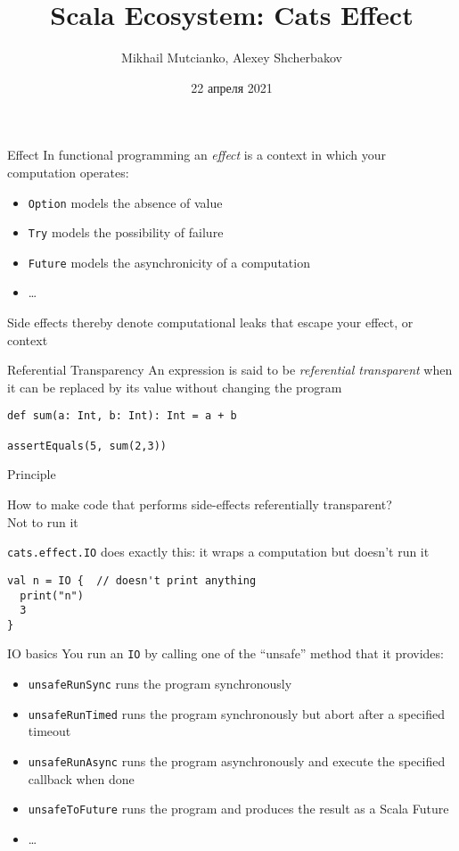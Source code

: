 \documentclass[aspectratio=169]{beamer}
\title{Scala Ecosystem: Cats Effect}
\author{Mikhail Mutcianko, Alexey Shcherbakov}
\institute{СПБгУ, СП}
\date{22 апреля 2021}
\begin{document}
\frame{\titlepage}

\begin{frame}{Effect}
  In functional programming an \textit{effect} is a context in which your computation operates:
  \begin{itemize}
    \item \texttt{Option} models the absence of value
    \item \texttt{Try} models the possibility of failure
    \item \texttt{Future} models the asynchronicity of a computation
    \item \ldots
  \end{itemize}
  \bigskip
  Side effects thereby denote computational leaks that escape your effect, or context
\end{frame}

\begin{frame}[fragile]{Referential Transparency}
 An expression is said to be \textit{referential transparent} when it can be replaced by its value without
 changing the program
 \bigskip
\begin{verbatim}
def sum(a: Int, b: Int): Int = a + b

assertEquals(5, sum(2,3))
\end{verbatim}
\end{frame}

\begin{frame}[fragile]{Principle}
\begin{center}
How to make code that performs side-effects referentially transparent?\\
\pause
  \Large Not to run it
\end{center}
\pause
\texttt{cats.effect.IO} does exactly this: it wraps a computation but doesn’t run it

\begin{verbatim}
val n = IO {  // doesn't print anything
  print("n")
  3
}
\end{verbatim}
\end{frame}

\begin{frame}[fragile]{IO basics}
You run an \texttt{IO} by calling one of the “unsafe” method that it provides:
\begin{itemize}
  \item \texttt{unsafeRunSync} runs the program synchronously
  \item \texttt{unsafeRunTimed} runs the program synchronously but abort after a specified timeout 
  \item \texttt{unsafeRunAsync} runs the program asynchronously and execute the specified callback when done
  \item \texttt{unsafeToFuture} runs the program and produces the result as a Scala Future 
  \item \ldots
\end{itemize}
\end{frame}
\end{document}
